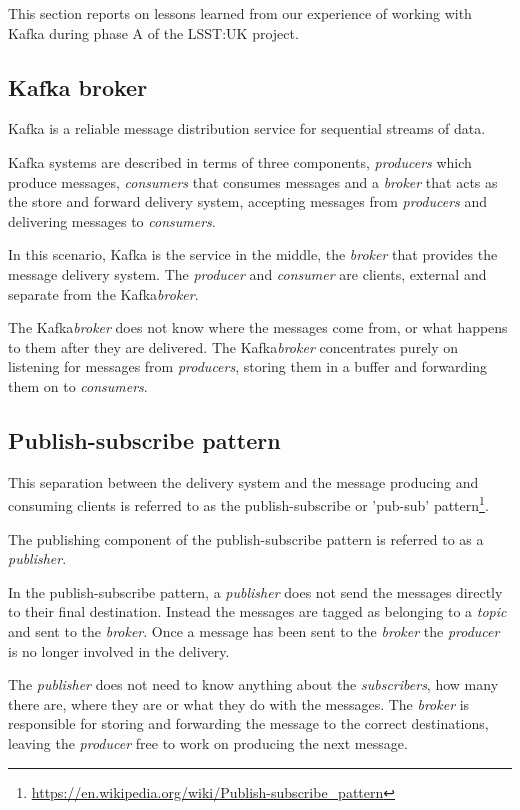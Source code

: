 \documentclass{article}
\newcommand{\kafka} {Kafka\xspace}
\newcommand{\kftopic} {\textit{topic}\xspace}
\newcommand{\kfbroker} {\textit{broker}\xspace}
\newcommand{\kfconsumer} {\textit{consumer}\xspace}
\newcommand{\kfconsumers} {\textit{consumers}\xspace}
\newcommand{\kfproducer} {\textit{producer}\xspace}
\newcommand{\kfproducers} {\textit{producers}\xspace}
\newcommand{\kfpublisher} {\textit{publisher}\xspace}
\newcommand{\kfsubscribers} {\textit{subscribers}\xspace}
\newcommand{\phasea} {phase A\xspace}
\newcommand{\lsstuk} {LSST:UK\xspace}
\newcommand{\footurl}[1] {\footnote{\url{#1}}}
\begin{document}
This section reports on lessons learned from our experience of working with \kafka during \phasea of the \lsstuk project.

\subsection{Kafka broker}
\label{kafka-broker}

\kafka is a reliable message distribution service for sequential streams of data.

\kafka systems are described in terms of three components, \kfproducers which produce messages, \kfconsumers that consumes messages and a \kfbroker that acts as the store and forward delivery system, accepting messages from \kfproducers and delivering messages to \kfconsumers.

In this scenario, \kafka is the service in the middle, the \kfbroker that provides the message delivery system. The \kfproducer and \kfconsumer are clients, external and separate from the \kafka \kfbroker.

The \kafka \kfbroker does not know where the messages come from, or what happens to them after they are delivered.
The \kafka \kfbroker concentrates purely on listening for messages from \kfproducers, storing them in a buffer and forwarding them on to \kfconsumers.

\subsection{Publish-subscribe pattern}
\label{kafka-pubsub-pattern}

This separation between the delivery system and the message producing and consuming clients is referred to as the publish-subscribe or 'pub-sub' pattern\footurl{https://en.wikipedia.org/wiki/Publish-subscribe_pattern}.

The publishing component of the publish-subscribe pattern is referred to as a \kfpublisher.

In the publish-subscribe pattern, a \kfpublisher does not send the messages directly to their final destination. Instead the messages are tagged as belonging to a \kftopic and sent to the \kfbroker.
Once a message has been sent to the \kfbroker the \kfproducer is no longer involved in the delivery.

The \kfpublisher does not need to know anything about the \kfsubscribers, how many there are, where they are or what they do with the messages.
The \kfbroker is responsible for storing and forwarding the message to the correct destinations, leaving the \kfproducer free to work on producing the next message.
\end{document}
